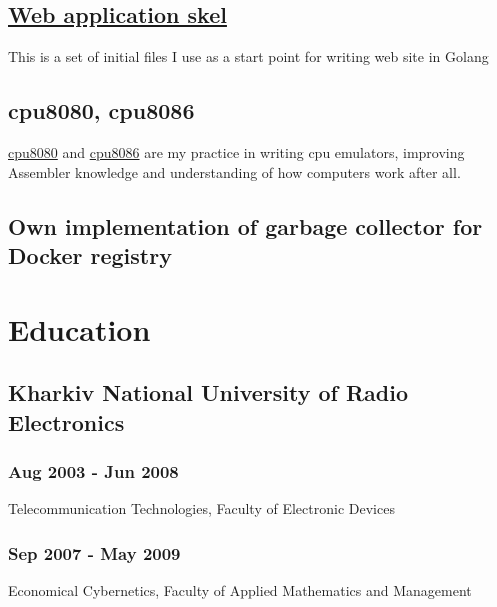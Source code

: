 \documentclass[letterpaper]{article}
\begin{document}
\subsection{\href{https://github.com/AlexJakeGreen/bars}{Web application skel}}
\label{sec-3-2}
This is a set of initial files I use as a start point for writing web site in Golang
\subsection{cpu8080, cpu8086}
\label{sec-3-3}
\href{https://github.com/AlexJakeGreen/cpu8080}{cpu8080} and \href{https://github.com/AlexJakeGreen/cpu8086}{cpu8086} are my practice in writing cpu emulators, improving Assembler knowledge and understanding of how computers work after all.
\subsection{Own implementation of garbage collector for Docker registry}
\label{sec-3-4}
\section{Education}
\label{sec-4}
\subsection{Kharkiv National University of Radio Electronics}
\label{sec-4-1}
\subsubsection{Aug 2003 - Jun 2008}
\label{sec-4-1-1}
Telecommunication Technologies, Faculty of Electronic Devices
\subsubsection{Sep 2007 - May 2009}
\label{sec-4-1-2}
Economical Cybernetics, Faculty of Applied Mathematics and Management
\end{document}
